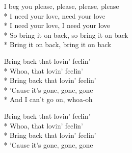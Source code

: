 \begin{SongText}
\begin{SongVerse}
        I beg you please, please, please, please\\*%
        I need your love, need your love\\*%
        I need your love, I need your love\\*%
        So bring it on back, so bring it on back\\*%
        Bring it on back, bring it on back
    \end{SongVerse}
    \begin{SongVerse}
        Bring back that lovin' feelin'\\*%
        Whoa, that lovin' feelin'\\*%
        Bring back that lovin' feelin'\\*%
        'Cause it's gone, gone, gone\\*%
        And I can't go on, whoa-oh
    \end{SongVerse}
    \begin{SongVerse}
        Bring back that lovin' feelin'\\*%
        Whoa, that lovin' feelin'\\*%
        Bring back that lovin' feelin'\\*%
        'Cause it's gone, gone, gone
    \end{SongVerse}
\end{SongText}
